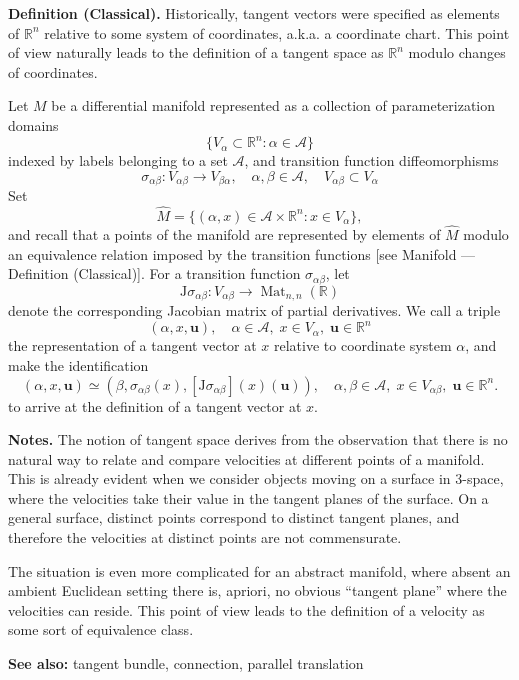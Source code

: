 \documentclass[12pt]{article}
\newcommand{\reals}{\mathbb{R}}
\newcommand{\cA}{\mathcal{A}}
\newcommand{\hM}{\hat{M}}
\newcommand{\Mat}{\mathop{\mathrm{Mat}}\nolimits}
\newcommand{\rJ}{\mathrm{J}}
\newcommand{\bu}{\mathbf{u}}
\begin{document}
{\bf Definition (Classical).}  Historically, tangent vectors were
specified as elements of $\reals^n$ relative to some system of
coordinates, a.k.a. a coordinate chart. This point of view naturally
leads to the definition of a tangent space as $\reals^n$ modulo changes
of coordinates.  

Let $M$ be a differential manifold represented as a collection of
parameterization domains
$$\{V_\alpha\subset\reals^n:\alpha\in \cA\}$$ indexed by labels
belonging to a set $\cA$, and 
transition function diffeomorphisms
$$\sigma_{\alpha\beta}:V_{\alpha\beta}\rightarrow
V_{\beta\alpha},\quad \alpha,\beta\in \cA,\quad V_{\alpha\beta}\subset
V_\alpha$$
Set 
$$\hM = \{ (\alpha,x)\in \cA\times \reals^n: x\in V_\alpha\},$$
and recall that a points of the manifold are represented by elements
of $\hM$ modulo an equivalence relation imposed by the transition functions
[see Manifold --- Definition (Classical)].
For a transition function $\sigma_{\alpha\beta}$,  let
$$\rJ\sigma_{\alpha\beta}:V_{\alpha\beta}\rightarrow
\Mat_{n,n}(\reals)$$
denote the corresponding Jacobian matrix of partial derivatives.   We
call a triple
$$(\alpha,x,\bu),\quad \alpha\in\cA,\; x\in V_\alpha,\; \bu\in
\reals^n$$
the representation of a tangent vector at $x$ relative to coordinate
system $\alpha$, and make the identification
$$(\alpha,x,\bu) \simeq
(\beta,\sigma_{\alpha\beta}(x),[\rJ\sigma_{\alpha\beta}](x)(\bu)),\quad
\alpha,\beta\in \cA,\; x\in V_{\alpha\beta},\; \bu \in \reals^n.$$
to arrive at the definition of a tangent vector at $x$.


{\bf Notes.} The notion of tangent space derives from the observation
that there is no natural way to relate and compare velocities at
different points of a manifold.  This is already evident when we
consider objects moving on a surface in 3-space, where the velocities
take their value in the tangent planes of the surface. On a general
surface, distinct points correspond to distinct tangent planes, and
therefore the velocities at distinct points are not commensurate.

The situation is even more complicated for an abstract manifold, where
absent an ambient Euclidean setting there is, apriori, no obvious
``tangent plane'' where the velocities can reside.  This point of view
leads to the definition of a velocity as some sort of equivalence
class.


{\bf See also:} tangent bundle, connection, parallel translation
\end{document}
